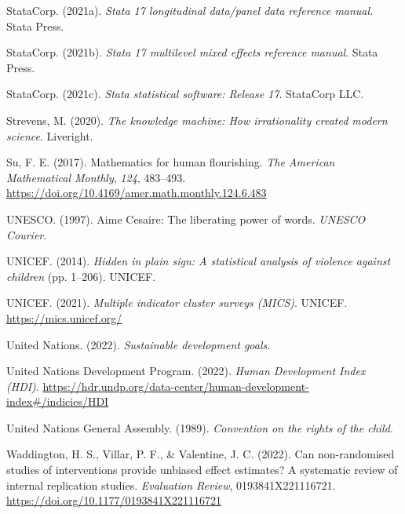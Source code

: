 \documentclass[
  letterpaper,
  DIV=11,
  numbers=noendperiod]{scrreprt}
\newlength{\cslhangindent}
\newlength{\cslentryspacingunit} %
\newenvironment{CSLReferences}[2] %
 {%
  \setlength{\parindent}{0pt}
  \ifodd #1
  \let\oldpar\par
  \def\par{\hangindent=\cslhangindent\oldpar}
  \fi
  \setlength{\parskip}{#2\cslentryspacingunit}
 }%
 {}
\begin{document}
\begin{CSLReferences}{1}{0}
\leavevmode{}%
StataCorp. (2021a). \emph{Stata 17 longitudinal data/panel data
reference manual}. Stata Press.

\leavevmode{}%
StataCorp. (2021b). \emph{Stata 17 multilevel mixed effects reference
manual}. Stata Press.

\leavevmode{}%
StataCorp. (2021c). \emph{Stata statistical software: Release 17}.
StataCorp LLC.

\leavevmode{}%
Strevens, M. (2020). \emph{The knowledge machine: How irrationality
created modern science}. Liveright.

\leavevmode{}%
Su, F. E. (2017). Mathematics for human flourishing. \emph{The American
Mathematical Monthly}, \emph{124}, 483--493.
\url{https://doi.org/10.4169/amer.math.monthly.124.6.483}

\leavevmode{}%
UNESCO. (1997). {A}ime {C}esaire: The liberating power of words.
\emph{UNESCO Courier}.

\leavevmode{}%
UNICEF. (2014). \emph{Hidden in plain sign: A statistical analysis of
violence against children} (pp. 1--206). UNICEF.

\leavevmode{}%
UNICEF. (2021). \emph{Multiple indicator cluster surveys (MICS)}.
UNICEF. \url{https://mics.unicef.org/}

\leavevmode{}%
United Nations. (2022). \emph{Sustainable development goals}.

\leavevmode{}%
United Nations Development Program. (2022). \emph{{Human Development
Index (HDI)}}.
\url{https://hdr.undp.org/data-center/human-development-index\#/indicies/HDI}

\leavevmode{}%
United Nations General Assembly. (1989). \emph{Convention on the rights
of the child}.

\leavevmode{}%
Waddington, H. S., Villar, P. F., \& Valentine, J. C. (2022). Can
non-randomised studies of interventions provide unbiased effect
estimates? A systematic review of internal replication studies.
\emph{Evaluation Review}, 0193841X221116721.
\url{https://doi.org/10.1177/0193841X221116721}


\end{CSLReferences}
\end{document}
